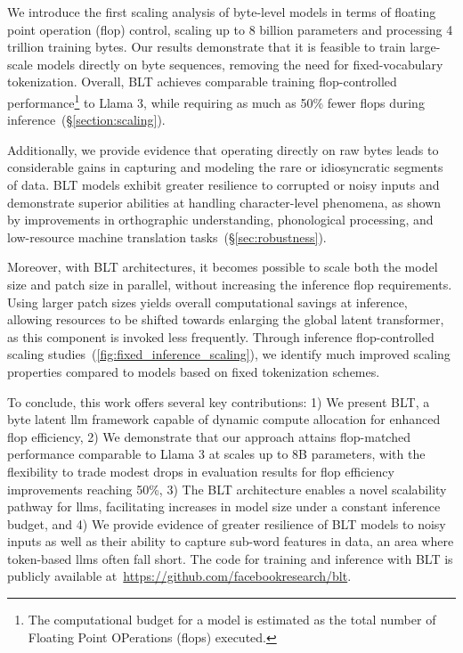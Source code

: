We introduce the first scaling analysis of byte-level models in terms of floating point operation (flop) control, scaling up to 8 billion parameters and processing 4 trillion training bytes. Our results demonstrate that it is feasible to train large-scale models directly on byte sequences, removing the need for fixed-vocabulary tokenization. Overall, {\textsc BLT} achieves comparable training flop-controlled performance\footnote{The computational budget for a model is estimated as the total number of Floating Point OPerations (flops) executed.} to Llama 3, while requiring as much as 50\% fewer flops during inference~(\S\ref{section:scaling}).

Additionally, we provide evidence that operating directly on raw bytes leads to considerable gains in capturing and modeling the rare or idiosyncratic segments of data. {\textsc BLT} models exhibit greater resilience to corrupted or noisy inputs and demonstrate superior abilities at handling character-level phenomena, as shown by improvements in orthographic understanding, phonological processing, and low-resource machine translation tasks~(\S\ref{sec:robustness}).

Moreover, with {\textsc BLT} architectures, it becomes possible to scale both the model size and patch size in parallel, without increasing the inference flop requirements. Using larger patch sizes yields overall computational savings at inference, allowing resources to be shifted towards enlarging the global latent transformer, as this component is invoked less frequently. Through inference flop-controlled scaling studies~(\autoref{fig:fixed_inference_scaling}), we identify much improved scaling properties compared to models based on fixed tokenization schemes.

To conclude, this work offers several key contributions: 1) We present {\textsc BLT}, a byte latent llm framework capable of dynamic compute allocation for enhanced flop efficiency, 2) We demonstrate that our approach attains flop-matched performance comparable to Llama 3 at scales up to 8B parameters, with the flexibility to trade modest drops in evaluation results for flop efficiency improvements reaching 50\%, 3) The {\textsc BLT} architecture enables a novel scalability pathway for llms, facilitating increases in model size under a constant inference budget, and 4) We provide evidence of greater resilience of {\textsc BLT} models to noisy inputs as well as their ability to capture sub-word features in data, an area where token-based llms often fall short. The code for training and inference with {\textsc BLT} is publicly available at~\url{https://github.com/facebookresearch/blt}.

